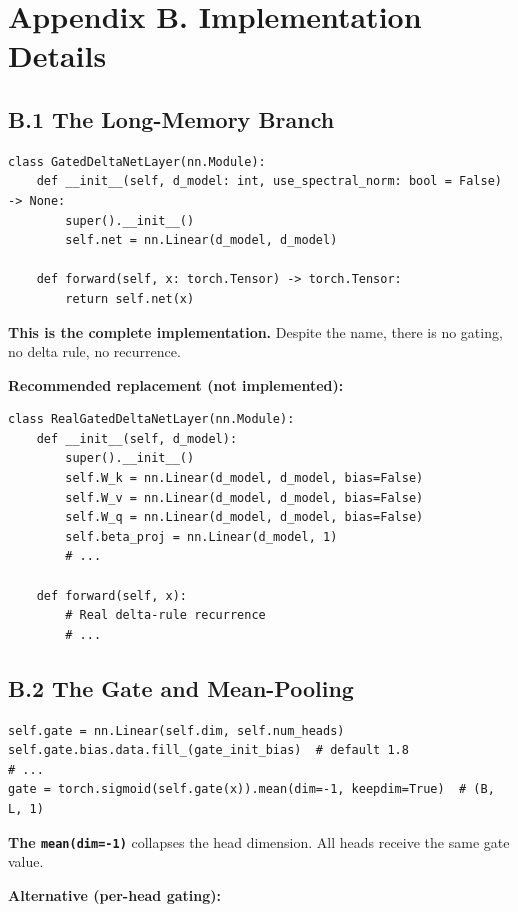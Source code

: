 
\section{Appendix B. Implementation Details}

\subsection{B.1 The Long-Memory Branch}

\begin{lstlisting}
class GatedDeltaNetLayer(nn.Module):
    def __init__(self, d_model: int, use_spectral_norm: bool = False) -> None:
        super().__init__()
        self.net = nn.Linear(d_model, d_model)

    def forward(self, x: torch.Tensor) -> torch.Tensor:
        return self.net(x)
\end{lstlisting}

\textbf{This is the complete implementation.} Despite the name, there is no 
gating, no delta rule, no recurrence.

\textbf{Recommended replacement (not implemented):}

\begin{lstlisting}
class RealGatedDeltaNetLayer(nn.Module):
    def __init__(self, d_model):
        super().__init__()
        self.W_k = nn.Linear(d_model, d_model, bias=False)
        self.W_v = nn.Linear(d_model, d_model, bias=False)
        self.W_q = nn.Linear(d_model, d_model, bias=False)
        self.beta_proj = nn.Linear(d_model, 1)
        # ...

    def forward(self, x):
        # Real delta-rule recurrence
        # ...
\end{lstlisting}

\subsection{B.2 The Gate and Mean-Pooling}

\begin{lstlisting}
self.gate = nn.Linear(self.dim, self.num_heads)
self.gate.bias.data.fill_(gate_init_bias)  # default 1.8
# ...
gate = torch.sigmoid(self.gate(x)).mean(dim=-1, keepdim=True)  # (B, L, 1)
\end{lstlisting}

\textbf{The \texttt{mean(dim=-1)}} collapses the head dimension. All heads receive the 
same gate value.

\textbf{Alternative (per-head gating):}

